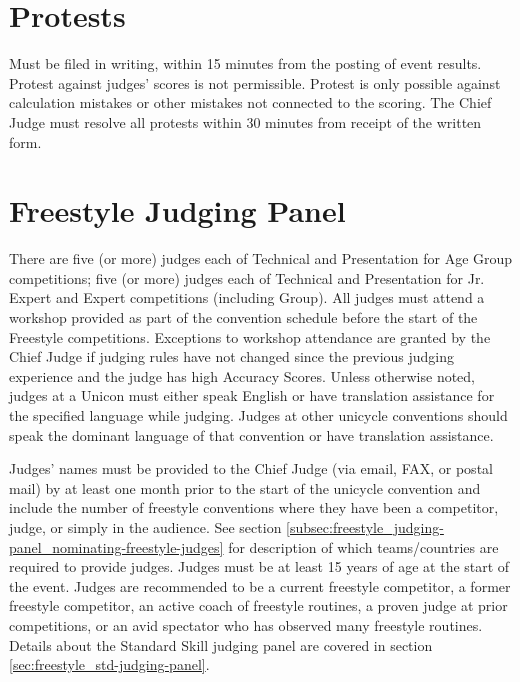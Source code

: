 \section{Protests}
Must be filed in writing, within 15 minutes from the posting of event results.
Protest against judges' scores is not permissible.
Protest is only possible against calculation mistakes or other mistakes not connected to the scoring.
The Chief Judge must resolve all protests within 30 minutes from receipt of the written form.

\section{Freestyle Judging Panel \label{sec:freestyle_judging-panel}}
There are five (or more) judges each of Technical and Presentation for Age Group competitions; five (or more) judges each of Technical and Presentation for Jr. Expert and Expert competitions (including Group).
All judges must attend a workshop provided as part of the convention schedule before the start of the Freestyle competitions.
Exceptions to workshop attendance are granted by the Chief Judge if judging rules have not changed since the previous judging experience and the judge has high Accuracy Scores.
Unless otherwise noted, judges at a Unicon must either speak English or have translation assistance for the specified language while judging.
Judges at other unicycle conventions should speak the dominant language of that convention or have translation assistance.

Judges' names must be provided to the Chief Judge (via email, FAX, or postal mail) by at least one month prior to the start of the unicycle convention and include the number of freestyle conventions where they have been a competitor, judge, or simply in the audience.
See section \ref{subsec:freestyle_judging-panel_nominating-freestyle-judges} for description of which teams/countries are required to provide judges.
Judges must be at least 15 years of age at the start of the event.
Judges are recommended to be a current freestyle competitor, a former freestyle competitor, an active coach of freestyle routines, a proven judge at prior competitions, or an avid spectator who has observed many freestyle routines.
Details about the Standard Skill judging panel are covered in section \ref{sec:freestyle_std-judging-panel}.

